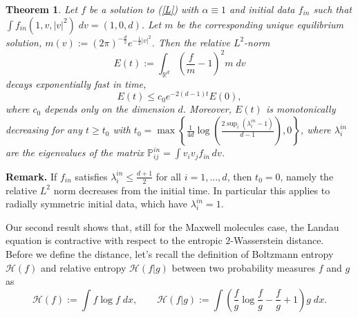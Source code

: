 \documentclass[11pt]{amsart}
\numberwithin{equation}{section}
\def\R{\mathbb{R}}
\newtheorem{theorem}{Theorem}
\begin{document}
\begin{theorem}\label{thm:rel_L2_monotone}
  Let $f$ be a solution to (\ref{L})  with $\alpha \equiv 1$ and initial data $f_{in}$ such that 
  $ \int f_{in} (1, v, |v|^2) \;dv = (1,0,d)$.   Let $m$ be the corresponding unique equilibrium solution, $m(v) :=(2\pi)^{-\frac{d}{2}}e^{-\frac{1}{2}\vert{v}\vert^{2}}$. Then the relative $L^2$-norm 
  \begin{equation*}
 E(t):=   \int_{\R^d}\left(\frac{f}{ m }-1\right)^{2} m \;dv
  \end{equation*}
 decays exponentially fast  in time, 
 $$
 E(t) \le c_0 e^{-2(d-1)t}E(0),
 $$
 where $c_0$ depends only on the dimension $d$. Moreover, $E(t)$ is monotonically decreasing for any $t \ge  t_0$ with $t_0 
 = \max\left\{\frac{1}{4d}\log\left(\frac{2\sup_i (\lambda_i^{in}-1)}{d-1}\right),0\right\}$, where $\lambda_i^{in}$ are the eigenvalues of the matrix $\mathbb{P}^{in}_{ij}=\int v_iv_jf_{in}\,dv$.
 \end{theorem}
{\bf{Remark.}}
If $f_{in}$ satisfies $\lambda_i^{in}\leq \frac{d+1}{2}$ for all $i = 1,...,d$,  then $t_0=0$, namely the relative $L^2$ norm decreases from the initial time. In particular this applies to radially symmetric initial data, which have ${\lambda_i^{in}=1}$.

Our second result shows that, still for the Maxwell molecules case, the Landau equation is contractive with respect to the entropic $2$-Wasserstein distance. Before we define the distance, let's recall the definition of Boltzmann entropy $\mathcal H(f)$ and relative entropy $\mathcal H(f|g)$ between two probability measures $f$ and $g$ as 
$$
\mathcal H(f) := \int f\log f \;dx,
\qquad
\mathcal H(f|g) := \int \left( \frac{f}{g}\log \frac{f}{g} -\frac{f}{g} +1\right) g\;dx .
$$
\end{document}
